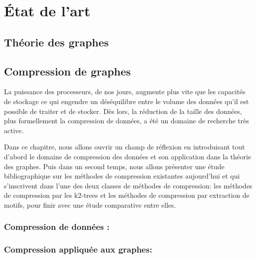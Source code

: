 \documentclass[a4paper,oneside,12pt]{report}
\renewcommand{\headrulewidth}{0pt} %
\renewcommand{\headrulewidth}{0pt}%
\renewcommand{\headrulewidth}{0.4pt}
\theoremstyle{definition}
\begin{document}
	\cleardoublepage
\pagestyle{fancy}
\fancypagestyle{plain}{%
  \fancyhf{}%
  \renewcommand{\headrulewidth}{0pt}%
  \fancyhf[lef,rof]{\thepage}%
}
\renewcommand{\headrulewidth}{0.4pt}
\fancyhead[R]{\rightmark}

\part{État de l'art}
	\chapter{ Théorie des graphes}
	  
	

	\chapter{Compression de graphes}
	La puissance des processeurs, de nos jours, augmente plus vite que les capacités de stockage ce qui engendre un déséquilibre entre le volume des données qu’il est possible de
traiter et de stocker. Dès lors, la réduction de la taille des données, plus formellement la compression de données, a été un domaine de recherche très active. 
		
		 Dans ce chapitre, nous allons
ouvrir un champ de réflexion en introduisant tout d’abord le domaine de compression des données et son application dans la théorie des graphes. Puis dans un second
temps, nous allons présenter une étude bibliographique sur les méthodes de compression existantes aujourd’hui et qui s'inscrivent dans l'une des deux classes de méthodes de compression: les méthodes de compression par les k2-trees et les méthodes de compression par extraction de motifs, pour finir avec une étude comparative entre elles.
	
		
		\section{Compression de données :}
		
			
		
		\section{Compression appliquée aux graphes:}
			
			
\end{document}

